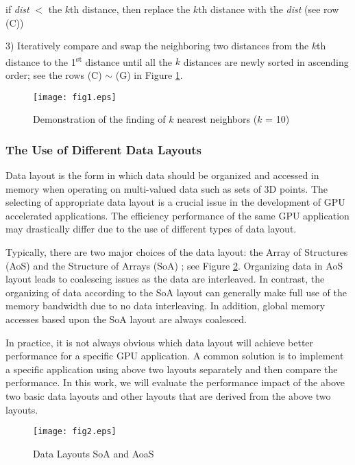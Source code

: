 \documentclass[fleqn,11pt]{wlscirep}
\begin{document}
if \textit{dist} $<$ the $k$th distance, then replace the $k$th distance with the \textit{dist} (see row 
(C))

3) Iteratively compare and swap the neighboring two distances from the $k$th 
distance to the 1\textsuperscript{st} distance until all the $k$ distances are newly sorted 
in ascending order; see the rows (C) $\sim $ (G) in Figure \ref{fig1:knn}.

\begin{figure}[ht]
	\centering
	\texttt{[image: fig1.eps]}
	\caption{Demonstration of the finding of $k$ nearest neighbors ($k$ = 10)}
	\label{fig1:knn}
\end{figure}

\subsubsection{The Use of Different Data Layouts}

Data layout is the form in which data should be organized and accessed in 
memory when operating on multi-valued data such as sets of 3D points. The 
selecting of appropriate data layout is a crucial issue in the development 
of GPU accelerated applications. The efficiency performance of the same GPU 
application may drastically differ due to the use of different types of data 
layout.

Typically, there are two major choices of the data layout: the Array of 
Structures (AoS) and the Structure of Arrays (SoA) \cite{36}; see Figure 
\ref{fig2:data layout}. Organizing data in AoS layout leads to coalescing issues as the data are 
interleaved. In contrast, the organizing of data according to the SoA layout 
can generally make full use of the memory bandwidth due to no data 
interleaving. In addition, global memory accesses based upon the SoA layout 
are always coalesced. 

In practice, it is not always obvious which data layout will achieve better 
performance for a specific GPU application. A common solution is to 
implement a specific application using above two layouts separately and then 
compare the performance. In this work, we will evaluate the performance 
impact of the above two basic data layouts and other layouts that are 
derived from the above two layouts. 

\begin{figure}[ht]
	\centering
	\texttt{[image: fig2.eps]}
	\caption{Data Layouts SoA and AoaS}
	\label{fig2:data layout}
\end{figure}
\end{document}
